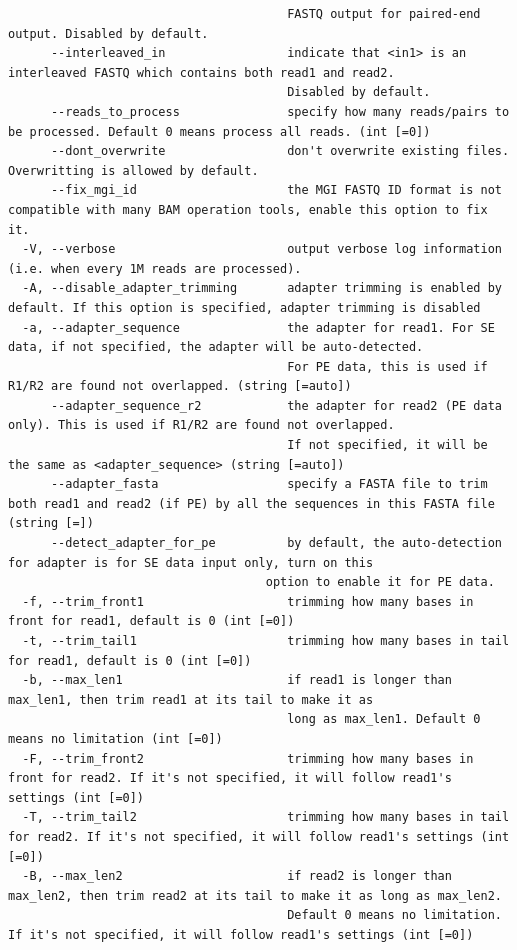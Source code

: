 \documentclass[
  letterpaper,
]{book}
\begin{document}
\begin{verbatim}
                                       FASTQ output for paired-end output. Disabled by default.
      --interleaved_in                 indicate that <in1> is an interleaved FASTQ which contains both read1 and read2.
                                       Disabled by default.
      --reads_to_process               specify how many reads/pairs to be processed. Default 0 means process all reads. (int [=0])
      --dont_overwrite                 don't overwrite existing files. Overwritting is allowed by default.
      --fix_mgi_id                     the MGI FASTQ ID format is not compatible with many BAM operation tools, enable this option to fix it.
  -V, --verbose                        output verbose log information (i.e. when every 1M reads are processed).
  -A, --disable_adapter_trimming       adapter trimming is enabled by default. If this option is specified, adapter trimming is disabled
  -a, --adapter_sequence               the adapter for read1. For SE data, if not specified, the adapter will be auto-detected.
                                       For PE data, this is used if R1/R2 are found not overlapped. (string [=auto])
      --adapter_sequence_r2            the adapter for read2 (PE data only). This is used if R1/R2 are found not overlapped.
                                       If not specified, it will be the same as <adapter_sequence> (string [=auto])
      --adapter_fasta                  specify a FASTA file to trim both read1 and read2 (if PE) by all the sequences in this FASTA file (string [=])
      --detect_adapter_for_pe          by default, the auto-detection for adapter is for SE data input only, turn on this
                                    option to enable it for PE data.
  -f, --trim_front1                    trimming how many bases in front for read1, default is 0 (int [=0])
  -t, --trim_tail1                     trimming how many bases in tail for read1, default is 0 (int [=0])
  -b, --max_len1                       if read1 is longer than max_len1, then trim read1 at its tail to make it as
                                       long as max_len1. Default 0 means no limitation (int [=0])
  -F, --trim_front2                    trimming how many bases in front for read2. If it's not specified, it will follow read1's settings (int [=0])
  -T, --trim_tail2                     trimming how many bases in tail for read2. If it's not specified, it will follow read1's settings (int [=0])
  -B, --max_len2                       if read2 is longer than max_len2, then trim read2 at its tail to make it as long as max_len2.
                                       Default 0 means no limitation. If it's not specified, it will follow read1's settings (int [=0])

\end{verbatim}
\end{document}
